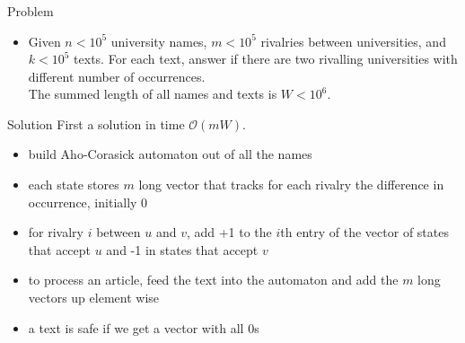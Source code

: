 \begin{frame}
    \frametitle{\problemtitle}
    \begin{block}{Problem}
    \begin{itemize}
        \item Given $n<10^5$ university names, $m<10^5$ rivalries between universities, and $k<10^5$ texts. For each text, answer if there are two rivalling universities with different number of occurrences.\\
        The summed length of all names and texts is $W<10^6$.
    \end{itemize}
    \end{block}
    \pause

    \begin{block}{Solution}
    First a solution in time $\mathcal O(mW)$.
    \pause
    \begin{itemize}
        \item<+-> build Aho-Corasick automaton out of all the names
        \item<+-> each state stores $m$ long vector that tracks for each rivalry the difference in occurrence, initially 0
        \item<+-> for rivalry $i$ between $u$ and $v$, add +1 to the $i$th entry of the vector of states that accept $u$ and -1 in states that accept $v$
        \item<+-> to process an article, feed the text into the automaton and add the $m$ long vectors up element wise
        \item<+-> a text is safe if we get a vector with all 0s
    \end{itemize}

    \end{block}
\end{frame}
